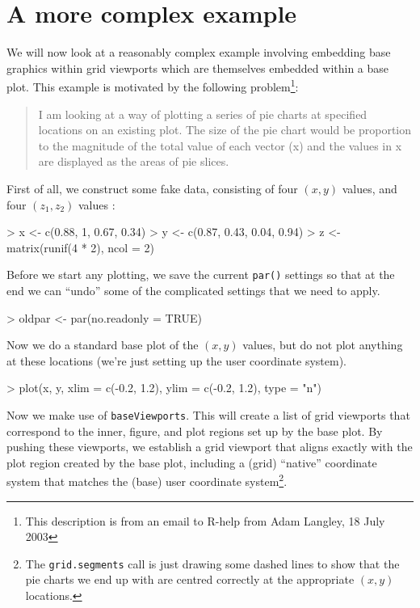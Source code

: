 \documentclass[a4paper]{article}
\begin{document}
\section*{A more complex example}

We will now look at a reasonably complex example involving
embedding base graphics within grid viewports which are themselves
embedded within a base plot.  This example is motivated by
 the following problem\footnote{This description is from an email to 
R-help from Adam Langley, 18 July 2003}:

\begin{quote}
I am looking at a way of plotting a series of pie charts at specified
locations on an existing plot. The size of the pie chart would be proportion
to the magnitude of the total value of each vector (x) and the values in x
are displayed as the areas of pie slices.
\end{quote}

First of all, we construct some fake data, consisting of four
$(x, y)$ values, and four $(z_1, z_2)$ values :

\begin{Schunk}
\begin{Sinput}
> x <- c(0.88, 1, 0.67, 0.34)
> y <- c(0.87, 0.43, 0.04, 0.94)
> z <- matrix(runif(4 * 2), ncol = 2)
\end{Sinput}
\end{Schunk}
Before we start any plotting, we save the current \verb|par()| 
settings so that at the end 
we can ``undo'' some of the complicated settings
that we need to apply.

\begin{Schunk}
\begin{Sinput}
> oldpar <- par(no.readonly = TRUE)
\end{Sinput}
\end{Schunk}
Now we do a standard base plot of the $(x, y)$ values, but do not
plot  anything at these locations (we're just setting up the
user coordinate system).

\begin{Schunk}
\begin{Sinput}
> plot(x, y, xlim = c(-0.2, 1.2), ylim = c(-0.2, 1.2), type = "n")
\end{Sinput}
\end{Schunk}
Now we make use of \verb|baseViewports|.
This will create a list of grid viewports that correspond to the 
inner, figure, and plot regions set up by the base plot.
By pushing these viewports, we establish a grid viewport that aligns
exactly with the plot region created by the base plot, including a
(grid) ``native'' coordinate system that matches the
(base) user coordinate system\footnote{
The {\tt grid.segments} call is just drawing some 
dashed lines to show that the pie charts we end up with 
are centred correctly at the appropriate $(x, y)$ locations.}.
\end{document}
